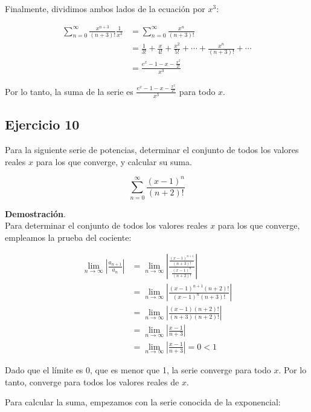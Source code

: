 \documentclass{article}
\begin{document}
    Finalmente, dividimos ambos lados de la ecuación por $x^{3}$:

    \begin{align*}
    \sum_{n=0}^{\infty} \frac{x^{n+3}}{(n+3)!} \frac{1}{x^{3}} &= \sum_{n=0}^{\infty} \frac{x^{n}}{(n+3)!} \\
    &= \frac{1}{3!} + \frac{x}{4!} + \frac{x^{2}}{5!} + \cdots + \frac{x^{n}}{(n+3)!} + \cdots \\
    &= \frac{e^{x} - 1 - x - \frac{x^{2}}{2!}}{x^{3}}
    \end{align*}

    Por lo tanto, la suma de la serie es \(\frac{e^{x}-1-x-\frac{x^{2}}{2!}}{x^{3}}\) para todo $x$.

    \subsection*{Ejercicio 10}

    Para la siguiente serie de potencias, determinar el conjunto de todos los valores reales $x$ para los que converge, y calcular su suma.

    $$
    \sum_{n=0}^{\infty} \frac{(x-1)^{n}}{(n+2)!}
    $$

    \textbf{Demostración}.\\

    Para determinar el conjunto de todos los valores reales $x$ para los que converge, empleamos la prueba del cociente:

    \begin{align*}
    \lim _{n \rightarrow \infty}\left|\frac{a_{n+1}}{a_{n}}\right| &= \lim _{n \rightarrow \infty}\left|\frac{\frac{(x-1)^{n+1}}{(n+3)!}}{\frac{(x-1)^{n}}{(n+2)!}}\right| \\
    &= \lim _{n \rightarrow \infty}\left|\frac{(x-1)^{n+1}(n+2)!}{(x-1)^{n}(n+3)!}\right| \\
    &= \lim _{n \rightarrow \infty}\left|\frac{(x-1)(n+2)!}{(n+3)(n+2)!}\right| \\
    &= \lim _{n \rightarrow \infty}\left|\frac{x-1}{n+3}\right| \\
    &= \lim _{n \rightarrow \infty}\left|\frac{x-1}{n+3}\right| = 0 < 1
    \end{align*}

    Dado que el límite es 0, que es menor que 1, la serie converge para todo $x$. Por lo tanto, converge para todos los valores reales de $x$.

    Para calcular la suma, empezamos con la serie conocida de la exponencial:
\end{document}
